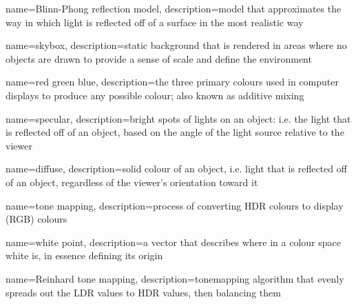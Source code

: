  {
  name=Blinn-Phong reflection model,
  description={model that approximates the way in which light is reflected off of a surface in the most realistic way}
}

 {
  name=skybox,
  description={static background that is rendered in areas where no objects are drawn to provide a sense of scale and define the environment}
}

 {
  name=red green blue,
  description={the three primary colours used in computer displays to produce any possible colour; also known as additive mixing}
}

 {
  name=specular,
  description={bright spots of lights on an object: i.e. the light that is reflected off of an object, based on the angle of the light source relative to the viewer}
}

 {
  name=diffuse,
  description={solid colour of an object, i.e. light that is reflected off of an object, regardless of the viewer's orientation toward it}
}

 {
  name=tone mapping,
  description={process of converting \gls{HDR} colours to display (\gls{RGB}) colours}
}

 {
  name=white point,
  description={a vector that describes where in a colour space white is, in essence defining its origin}
}

 {
  name=Reinhard tone mapping,
  description={\gls{tonemapping} algorithm that evenly spreads out the \gls{LDR} values to \gls{HDR} values, then balancing them}
}